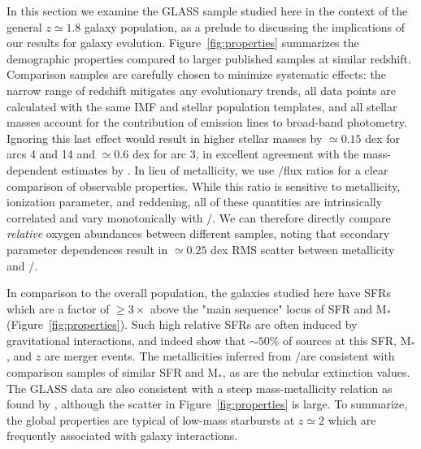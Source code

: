 In this section we examine the GLASS sample studied here in the context of the general $z\simeq1.8$ galaxy
population, as a prelude to discussing the implications of our results for galaxy evolution.
Figure~\ref{fig:properties} summarizes the demographic properties compared to larger published samples at similar
redshift. Comparison samples are carefully chosen to minimize systematic effects: the narrow range of redshift
mitigates any evolutionary trends, all data points are calculated with the same IMF and stellar population
templates, and all stellar masses account for the contribution of emission lines to broad-band photometry.
Ignoring this last effect would result in higher stellar masses by $\simeq0.15$ dex for arcs 4 and 14 and
$\simeq0.6$ dex for arc 3, in excellent agreement with the mass-dependent estimates by \cite{Whitaker2014}. In
lieu of metallicity, we use \OIII$/$\OII flux ratios for a clear comparison of observable properties. While this
ratio is sensitive to metallicity, ionization parameter, and reddening, all of these quantities are intrinsically
correlated and vary monotonically with \OIII$/$\OII \citep[e.g.,][]{Maiolino2008,Dopita2013}. We can therefore
directly compare {\em relative} oxygen abundances between different samples, noting that secondary parameter
dependences result in $\simeq0.25$ dex RMS scatter between metallicity and \OIII$/$\OII.

In comparison to the overall population, the galaxies studied here have SFRs which are a factor of $\geq3\times$
above the "main sequence" locus of SFR and M$_*$ (Figure~\ref{fig:properties}). Such high relative SFRs are often
induced by gravitational interactions, and indeed \cite{Stott2013} show that $\sim50$\% of sources at this SFR,
M$_*$, and $z$ are merger events. The metallicities inferred from \OIII$/$\OII are consistent with comparison
samples of similar SFR and M$_*$, as are the nebular extinction values. The GLASS data are also consistent with a
steep mass-metallicity relation as found by \cite{Henry2013}, although the scatter in Figure~\ref{fig:properties}
is large. To summarize, the global properties are typical of low-mass starbursts at $z\simeq2$ which are
frequently associated with galaxy interactions.


